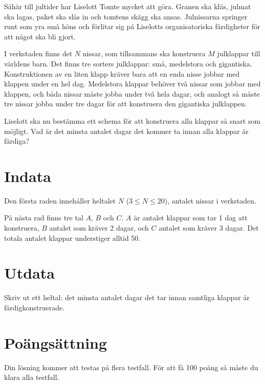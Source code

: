 Såhär till jultider har Liselott Tomte mycket att göra. Granen ska kläs, julmat ska lagas, paket ska slås in och tomtens skägg ska ansas. Julnissarna springer runt som yra små höns och förlitar sig på Liselotts organisatoriska färdigheter för att något ska bli gjort.

I verkstaden finns det $N$ nissar, som tillsammans ska konstruera $M$ julklappar till världens barn. 
 Det finns tre sorters julklappar: små, medelstora och gigantiska. Konstruktionen av en liten klapp kräver bara att en enda nisse jobbar med klappen under en hel dag. Medelstora klappar behöver två nissar som jobbar med klappen, och båda nissar måste jobba under två hela dagar, och analogt så måste tre nissar jobba under tre dagar för att konstruera den gigantiska julklappen.

Liselott ska nu bestämma ett schema för att konstruera alla klappar så snart som möjligt. Vad är det minsta antalet dagar det kommer ta innan alla klappar är färdiga?

\section*{Indata}
Den första raden innehåller heltalet $N$ ($3 \leq N \leq 20$), antalet nissar i verkstaden.

På nästa rad finns tre tal $A$, $B$ och $C$. $A$ är antalet klappar som tar 1 dag att konstruera, $B$ antalet som kräver 2 dagar, och $C$ antalet som kräver 3 dagar. Det totala antalet klappar understiger alltid 50.

\section*{Utdata}
Skriv ut ett heltal: det minsta antalet dagar det tar innan samtliga klappar är färdigkonstruerade.


\section*{Poängsättning}
Din lösning kommer att testas på flera testfall. För att få 100 poäng så måste du klara alla testfall.
